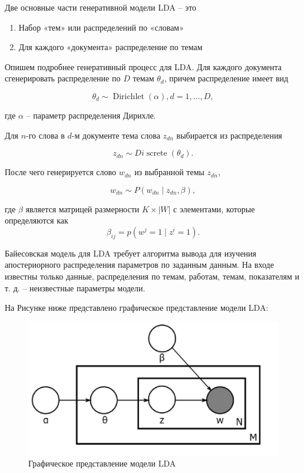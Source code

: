\documentclass[12pt,a4paper, oneside]{extreport}
\begin{document}
Две основные части генеративной модели LDA -- это

\begin{enumerate}
	\item Набор «тем» или распределений по «словам»
	\item Для каждого «документа» распределение  по темам 
\end{enumerate} 


Опишем подробнее  генеративный процесс для LDA. Для каждого документа сгенерировать  распределение по $D$ темам $\theta_{d}$, причем распределение имеет вид 

$$
\theta_{d} \sim \operatorname{Dirichlet}(\alpha), d=1, \ldots, D, 
$$

где  $\alpha$ -- параметр распределения Дирихле.

Для $n$-го слова в $d$-м документе тема слова $z_{d n}$ выбирается из распределения 

$$
z_{d n} \sim D i \operatorname{screte}\left(\theta_{d}\right).
$$ 

После чего генерируется  слово $w_{d n} $ из выбранной темы $z_{d n}$, 

$$
w_{d n} \sim P\left(w_{d n} \mid z_{d n}, \beta\right),
$$

где $\beta$ является  матрицей размерности $K \times|W|$ с элементами, которые определяются как
$$
\beta_{i j}=p\left(w^{j}=1 \mid z^{i}=1\right).
$$ 


Байесовская модель для LDA требует алгоритма вывода для изучения апостериорного распределения параметров по заданным данным. 
На входе известны  только данные, распределения по темам, работам, темам, показателям и т. д. --  неизвестные параметры модели. 


На Рисунке ниже представлено графическое представление модели LDA:

\begin{figure}[H]
	\centering
	\includegraphics[width=0.7\linewidth]{screenshot005}
	\caption{Графическое представление модели LDA}
	\label{fig:screenshot005}
\end{figure}
\end{document}
